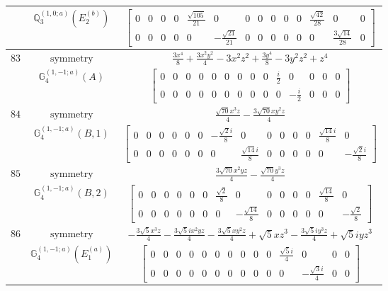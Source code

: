 \documentclass[fleqn,8pt,landscape]{jsarticle}
\begin{document}
\begin{longtable}{ccc}
$  $ & $ \mathbb{Q}_{3}^{(1,0;a)}(E_{2}^{(b)}) $ & $ \begin{bmatrix} 0 & 0 & 0 & 0 & \frac{\sqrt{105}}{21} & 0 & 0 & 0 & 0 & 0 & 0 & \frac{\sqrt{42}}{28} & 0 & 0 \\ 0 & 0 & 0 & 0 & 0 & - \frac{\sqrt{21}}{21} & 0 & 0 & 0 & 0 & 0 & 0 & \frac{3 \sqrt{14}}{28} & 0 \end{bmatrix} $ \\ \hline
$ 83 $ & $ \text{symmetry} $ & $ \frac{3 x^{4}}{8} + \frac{3 x^{2} y^{2}}{4} - 3 x^{2} z^{2} + \frac{3 y^{4}}{8} - 3 y^{2} z^{2} + z^{4} $ \\
$  $ & $ \mathbb{G}_{4}^{(1,-1;a)}(A) $ & $ \begin{bmatrix} 0 & 0 & 0 & 0 & 0 & 0 & 0 & 0 & 0 & \frac{i}{2} & 0 & 0 & 0 & 0 \\ 0 & 0 & 0 & 0 & 0 & 0 & 0 & 0 & 0 & 0 & - \frac{i}{2} & 0 & 0 & 0 \end{bmatrix} $ \\ \hline
$ 84 $ & $ \text{symmetry} $ & $ \frac{\sqrt{70} x^{3} z}{4} - \frac{3 \sqrt{70} x y^{2} z}{4} $ \\
$  $ & $ \mathbb{G}_{4}^{(1,-1;a)}(B,1) $ & $ \begin{bmatrix} 0 & 0 & 0 & 0 & 0 & 0 & - \frac{\sqrt{2} i}{8} & 0 & 0 & 0 & 0 & 0 & \frac{\sqrt{14} i}{8} & 0 \\ 0 & 0 & 0 & 0 & 0 & 0 & 0 & \frac{\sqrt{14} i}{8} & 0 & 0 & 0 & 0 & 0 & - \frac{\sqrt{2} i}{8} \end{bmatrix} $ \\ \hline
$ 85 $ & $ \text{symmetry} $ & $ \frac{3 \sqrt{70} x^{2} y z}{4} - \frac{\sqrt{70} y^{3} z}{4} $ \\
$  $ & $ \mathbb{G}_{4}^{(1,-1;a)}(B,2) $ & $ \begin{bmatrix} 0 & 0 & 0 & 0 & 0 & 0 & \frac{\sqrt{2}}{8} & 0 & 0 & 0 & 0 & 0 & \frac{\sqrt{14}}{8} & 0 \\ 0 & 0 & 0 & 0 & 0 & 0 & 0 & - \frac{\sqrt{14}}{8} & 0 & 0 & 0 & 0 & 0 & - \frac{\sqrt{2}}{8} \end{bmatrix} $ \\ \hline
$ 86 $ & $ \text{symmetry} $ & $ - \frac{3 \sqrt{5} x^{3} z}{4} - \frac{3 \sqrt{5} i x^{2} y z}{4} - \frac{3 \sqrt{5} x y^{2} z}{4} + \sqrt{5} x z^{3} - \frac{3 \sqrt{5} i y^{3} z}{4} + \sqrt{5} i y z^{3} $ \\
$  $ & $ \mathbb{G}_{4}^{(1,-1;a)}(E_{1}^{(a)}) $ & $ \begin{bmatrix} 0 & 0 & 0 & 0 & 0 & 0 & 0 & 0 & 0 & 0 & \frac{\sqrt{5} i}{4} & 0 & 0 & 0 \\ 0 & 0 & 0 & 0 & 0 & 0 & 0 & 0 & 0 & 0 & 0 & - \frac{\sqrt{3} i}{4} & 0 & 0 \end{bmatrix} $ \\ \hline

\end{longtable}
\end{document}
